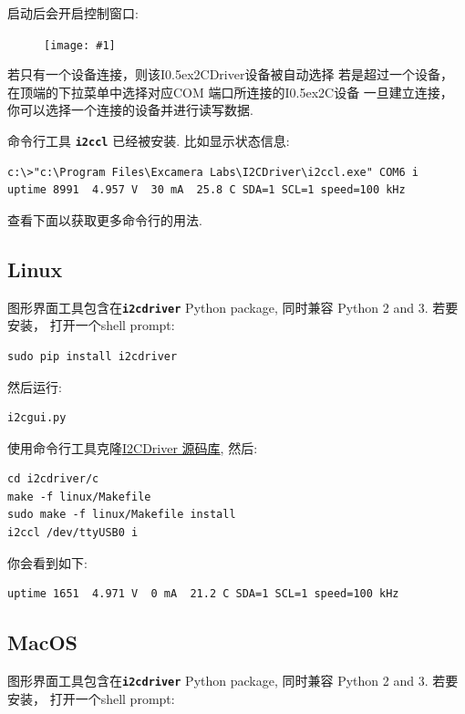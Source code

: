 \documentclass{article}
\newcommand{\two}{\raise0.5ex\hbox{\footnotesize{2}}}
\newcommand{\iic}{I\two{}C}
\newcommand{\iicdriver}{I\two{}CDriver}
\newcommand{\pngw}[2]{
\begin{figure}[H]
\begin{center}
\texttt{[image: \#1]}
\end{center}
\end{figure}
}
\newcommand{\mach}[1]{\texttt{\textbf{#1}}}
\begin{document}
启动后会开启控制窗口:

\pngw{img/i2cdriver/win32-gui}{1.0}

若只有一个设备连接，则该\iicdriver{}设备被自动选择
若是超过一个设备， 在顶端的下拉菜单中选择对应COM 端口所连接的\iic{}设备
一旦建立连接， 你可以选择一个连接的设备并进行读写数据.

命令行工具 \mach{i2ccl}  已经被安装.  比如显示状态信息:

\begin{lstlisting}
c:\>"c:\Program Files\Excamera Labs\I2CDriver\i2ccl.exe" COM6 i
uptime 8991  4.957 V  30 mA  25.8 C SDA=1 SCL=1 speed=100 kHz
\end{lstlisting}

查看下面以获取更多命令行的用法.

\subsection{Linux}

图形界面工具包含在\mach{i2cdriver} Python package, 同时兼容 Python 2 and 3.
若要安装， 打开一个shell prompt:

\begin{lstlisting}
sudo pip install i2cdriver
\end{lstlisting}

然后运行:

\begin{lstlisting}
i2cgui.py
\end{lstlisting}

使用命令行工具克隆\href{https://github.com/jamesbowman/i2cdriver}{I2CDriver 源码库},
然后:

\begin{lstlisting}
cd i2cdriver/c
make -f linux/Makefile
sudo make -f linux/Makefile install
i2ccl /dev/ttyUSB0 i
\end{lstlisting}

你会看到如下:

\begin{lstlisting}
uptime 1651  4.971 V  0 mA  21.2 C SDA=1 SCL=1 speed=100 kHz
\end{lstlisting}

\subsection{MacOS}

图形界面工具包含在\mach{i2cdriver} Python package, 同时兼容 Python 2 and 3.
若要安装， 打开一个shell prompt:
\end{document}
